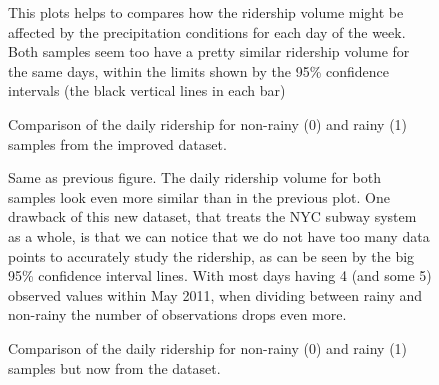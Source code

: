 \documentclass[a4paper,12pt,english]{sphinxmanual}
\begin{document}
\begin{figure}[htbp]
\centering
\capstart

\caption{Comparison of the daily ridership for non-rainy (0) and rainy (1) samples from
the improved dataset.}{\small 
This plots helps to compares how the ridership volume might be affected by the
precipitation conditions for each day of the week. Both samples seem too have
a pretty similar ridership volume for the same days, within the limits shown
by the 95\% confidence intervals (the black vertical lines in each bar)
}\label{section3:figure45}\end{figure}
\begin{figure}[htbp]
\centering
\capstart

\caption{Comparison of the daily ridership for non-rainy (0) and rainy (1) samples but
now from the  dataset.}{\small 
Same as previous figure. The daily ridership volume for both samples look even
more similar than in the previous plot. One drawback of this new dataset, that
treats the NYC subway system as a whole, is that we can notice that we do not
have too many data points to accurately study the ridership, as can be
seen by the big 95\% confidence interval lines. With most days having 4 (and
some 5) observed values within May 2011, when dividing between rainy and
non-rainy the number of observations drops even more.
}\label{section3:figure46}\end{figure}
\end{document}
